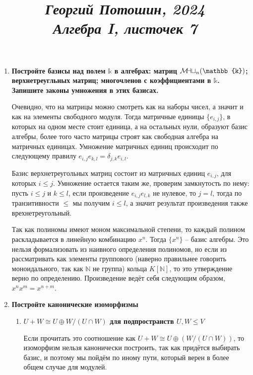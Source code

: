 \documentclass{article}
\title{
\textit{\small{Георгий Потошин, 2024}}\\
\vspace{0.3ex}
\textit{\huge{Алгебра I, листочек 7}}\vspace{1ex}
}
\date{\vspace{-10ex}}
\newcommand{\mymat}{\mathcal{M\mkern-3mu a\mkern-0.3mu t}}
\begin{document}
\maketitle

\begin{enumerate}
    \item \textbf{Постройте базисы над полем $\mathbb{k}$ в алгебрах: матриц $\mymat_n(\mathbb{k})$;
        верхнетреугльных матриц; многочленов с коэффициентами в $\mathbb{k}$. Запишите законы умножения
        в этих базисах.}

        Очевидно, что на матрицы можно смотреть как на наборы чисел, а значит и как на элементы свободного модуля.
        Тогда матричные единицы $\{e_{i,j}\}$, в которых на одном месте стоит единица, а  на остальных нули,
        образуют базис алгебры, более того часто матрицы строят как свободная алгебра на матричных единицах. Умножение
        матричных единиц происходит по следующему правилу $e_{i,j}e_{k,l}=\delta_{j,k}e_{i,l}$.

        Базис верхнетреугольных матриц состоит из матричных единиц $e_{i,j}$, для которых $i\leq j$. Умножение остается
        таким же, проверим замкнутость по нему: пусть $i\leq j$ и $k\leq l$, если произведение $e_{i,j}e_{l,k}$ не нулевое,
        то $j=l$, тогда по транзитивности $\leq$ мы получим $i\leq l$, а значит результат произведения также врехнетреугольный.

        Так как полиномы имеют моном максимальной степени, то каждый полином раскладывается в линейную комбинацию $x^n$.
        Тогда $\{x^n\}$ – базис алгебры. Это нельзя формализовать из наивного определения полиномов, но если из рассматривать
        как элементы группового (наверно правильнее говорить моноидального, так как $\mathbb{N}$ не группа) кольца
        $K[\mathbb{N}]$, то это утверждение верно по определению. Произведение ведёт себя следующим образом, $x^nx^m=x^{n+m}$.

    \item \textbf{Постройте канонические изоморфизмы}
        \begin{enumerate} 
            \item \textbf{$U+W\cong U\oplus W/(U\cap W)$ для подпространств $U,W\leq V$}

                Если прочитать это соотношение как $U+W\cong U\oplus (W/(U\cap W))$, то изоморфизм нельзя канонически
                построить, так как придётся выбирать базис, и поэтому мы пойдём по иному пути, который верен в более общем
                случае для модулей.


\end{enumerate}
\end{enumerate}
\end{document}
